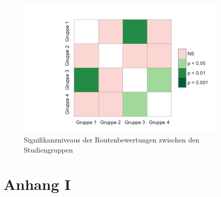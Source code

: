 \begin{figure}[t!]
    \centering
    \includegraphics[width=0.9\textwidth]{contents/06_model_evaluation/02_evaluation/res/rating_result_significance.pdf}
    \caption{Signifikanzniveaus der Routenbewertungen zwischen den Studiengruppen}
\end{figure}


\chapter{Anhang I}
\label{ch:appendix_1}